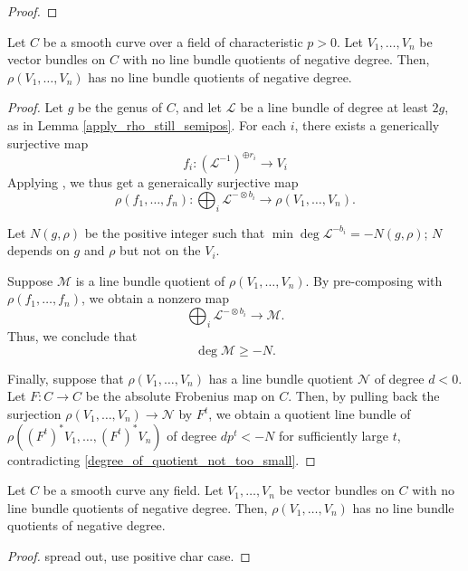 \begin{proof}

\end{proof}


\begin{lemma}
Let $C$ be a smooth curve over a field of characteristic $p>0$. Let $V_1,\ldots,V_n$ be vector bundles on $C$ with no line bundle quotients of negative degree. Then, $\rho(V_1,\ldots,V_n)$ has no line bundle quotients of negative degree.
\end{lemma}
\begin{proof}
Let $g$ be the genus of $C$, and let $\mathcal{L}$ be a line bundle of degree at least $2g$, as in Lemma \ref{apply_rho_still_semipos}. 
For each $i$, there exists a generically surjective map 
\begin{equation}
f_i:(\mathcal{L}^{-1})^{\oplus r_i}\to V_i
\end{equation}
Applying , we thus get a generaically surjective  map
\begin{equation}
\rho(f_1,\ldots,f_n):\bigoplus_{i}\mathcal{L}^{-\otimes b_i}\to\rho(V_1,\ldots,V_n).
\end{equation}

Let $N(g,\rho)$ be the positive integer such that $\min\deg\mathcal{L}^{-b_i}=-N(g,\rho)$; $N$ depends on $g$ and $\rho$ but not on the $V_i$.

Suppose $\mathcal{M}$ is a line bundle quotient of $\rho(V_1,\ldots,V_n)$. By pre-composing with $\rho(f_1,\ldots,f_n)$, we obtain a nonzero map
\begin{equation}
\bigoplus_{i}\mathcal{L}^{-\otimes b_i}\to\mathcal{M}.
\end{equation}
Thus, we conclude that
\begin{equation*}\label{degree_of_quotient_not_too_small}
\deg\mathcal{M}\ge -N.
\end{equation*}


Finally, suppose that $\rho(V_1,\ldots,V_n)$ has a line bundle quotient $\mathcal{N}$ of degree $d<0$. Let $F:C\to C$ be the absolute Frobenius map on $C$. Then, by pulling back the surjection $\rho(V_1,\ldots,V_n)\to\mathcal{N}$ by $F^t$, we obtain a quotient line bundle of $\rho((F^{t})^{*}V_1,\ldots,(F^{t})^{*}V_n)$ of degree $dp^{t}<-N$ for sufficiently large $t$, contradicting \ref{degree_of_quotient_not_too_small}.

\end{proof}

\begin{lemma}\label{no_negative_quotient_on_curve}
Let $C$ be a smooth curve any field. Let $V_1,\ldots,V_n$ be vector bundles on $C$ with no line bundle quotients of negative degree. Then, $\rho(V_1,\ldots,V_n)$ has no line bundle quotients of negative degree.
\end{lemma}
\begin{proof}
spread out, use positive char case.
\end{proof}


